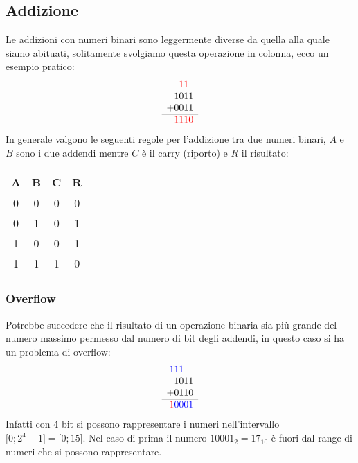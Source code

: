 \documentclass[../main.tex]{subfiles}
\begin{document}
\subsection{Addizione}
Le addizioni con numeri binari sono leggermente diverse da quella alla quale siamo abituati, solitamente svolgiamo questa operazione in colonna, ecco un esempio pratico:
$$
    \begin{array}{r}
        \color{red}\phantom{1}11\phantom{1} \\ %
            1011 \\
        +   0011 \\
            \hline
            \color{red}1110 \\
    \end{array}
$$
In generale valgono le seguenti regole per l'addizione tra due numeri binari, $A$ e $B$ sono i due addendi mentre $C$ è il carry (riporto) e $R$ il risultato:\\
\begin{center}
    \begin{tabular}{cc|cc}
    A & B & C & R \\ \hline
    0 & 0 & 0 & 0 \\
    0 & 1 & 0 & 1 \\
    1 & 0 & 0 & 1 \\
    1 & 1 & 1 & 0
    \end{tabular}
\end{center}

\subsubsection{Overflow}
Potrebbe succedere che il risultato di un operazione binaria sia più grande del numero massimo permesso dal numero di bit degli addendi, in questo caso si ha un problema di overflow:
$$
    \begin{array}{r}
        \color{blue}111\phantom{1}\phantom{1} \\ %
            1011 \\
        +   0110 \\
            \hline
            \color{red}1\color{blue}0001 \\
    \end{array}
$$
Infatti con 4 bit si possono rappresentare i numeri nell'intervallo $\lbrack 0;2^4-1 \rbrack = \lbrack 0;15 \rbrack $. Nel caso di prima il numero $10001_2 = 17_{10}$ è fuori dal range di numeri che si possono rappresentare.
\end{document}

